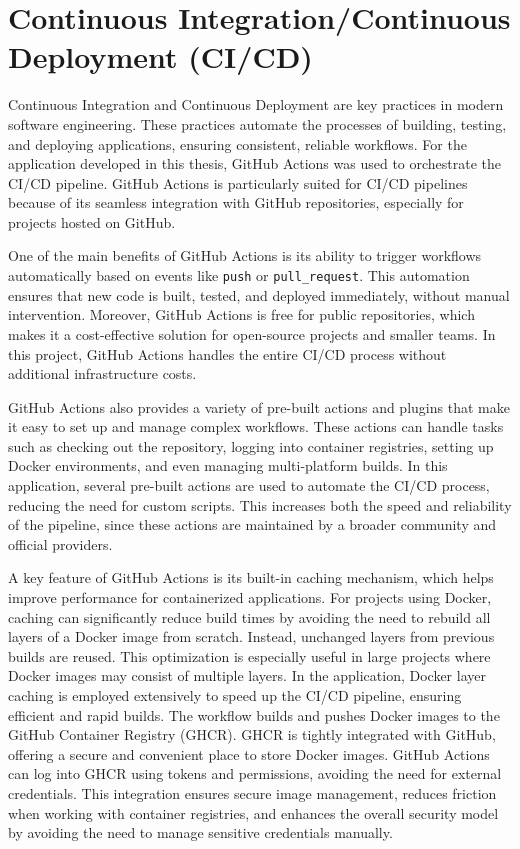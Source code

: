 \section{Continuous Integration/Continuous Deployment (CI/CD)}

Continuous Integration and Continuous Deployment are key practices in modern
software engineering. These practices automate the processes of building, testing,
and deploying applications, ensuring consistent, reliable workflows. For the
application developed in this thesis, GitHub Actions was used to orchestrate the
CI/CD pipeline. GitHub Actions is particularly suited for CI/CD pipelines because
of its seamless integration with GitHub repositories, especially for projects
hosted on GitHub.

One of the main benefits of GitHub Actions is its ability to trigger workflows
automatically based on events like \texttt{push} or \texttt{pull\_request}. This
automation ensures that new code is built, tested, and deployed immediately,
without manual intervention. Moreover, GitHub Actions is free for public
repositories, which makes it a cost-effective solution for open-source projects
and smaller teams. In this project, GitHub Actions handles the entire CI/CD process
without additional infrastructure costs.

GitHub Actions also provides a variety of pre-built actions and plugins that make
it easy to set up and manage complex workflows. These actions can handle tasks such
as checking out the repository, logging into container registries, setting up Docker
environments, and even managing multi-platform builds. In this application, several
pre-built actions are used to automate the CI/CD process, reducing the need for
custom scripts. This increases both the speed and reliability of the pipeline,
since these actions are maintained by a broader community and official providers.

A key feature of GitHub Actions is its built-in caching mechanism, which helps
improve performance for containerized applications. For projects using Docker,
caching can significantly reduce build times by avoiding the need to rebuild all
layers of a Docker image from scratch. Instead, unchanged layers from previous
builds are reused. This optimization is especially useful in large projects where
Docker images may consist of multiple layers. In the application, Docker layer
caching is employed extensively to speed up the CI/CD pipeline, ensuring efficient
and rapid builds.
The workflow builds and pushes Docker images to the GitHub Container Registry
(GHCR). GHCR is tightly integrated with GitHub, offering a secure and convenient
place to store Docker images. GitHub Actions can log into GHCR using tokens and
permissions, avoiding the need for external credentials. This integration ensures
secure image management, reduces friction when working with container registries,
and enhances the overall security model by avoiding the need to manage sensitive
credentials manually.

